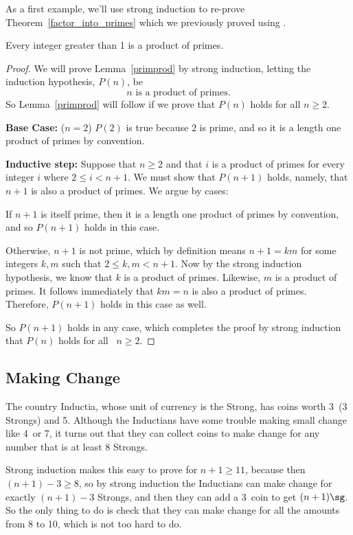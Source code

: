 As a first example, we'll use strong induction to re-prove
Theorem~\ref{factor_into_primes} which we previously proved using .

\begin{lemma}\label{primprod}
Every integer greater than 1 is a product of primes.
\end{lemma}

\begin{proof}

We will prove Lemma~\ref{primprod} by strong induction, letting the induction
hypothesis, $P(n)$, be
\[
n \text{ is a product of primes}.
\]
So Lemma~\ref{primprod} will follow if we prove that $P(n)$ holds for all $n
\geq 2$.

\textbf{Base Case:} ($n=2$) $P(2)$ is true because $2$ is prime, and so it is
a length one product of primes by convention.

\textbf{Inductive step:} Suppose that $n \geq 2$ and that $i$ is a product
of primes for every integer $i$ where $2 \leq i < n+1$.  We must show that
$P(n+1)$ holds, namely, that $n+1$ is also a product of primes.  We argue
by cases:

If $n+1$ is itself prime, then it is a length one product of primes by
convention, and so $P(n+1)$ holds in this case.

Otherwise, $n + 1$ is not prime, which by definition means $n+1 = km$ for
some integers $k,m$ such that $2 \leq k,m < n+1$.  Now by the strong induction
hypothesis, we know that $k$ is a product of primes.  Likewise,
$m$ is a product of primes.  It follows immediately that $km = n$ is
also a product of primes.  Therefore, $P(n+1)$ holds in this case as well.

So $P(n+1)$ holds in any case, which completes the proof by strong
induction that $P(n)$ holds for all ~$n \ge 2$.

\end{proof}

\subsection{Making Change}

The country Inductia, whose unit of currency is the Strong, has coins
worth 3\sg\ (3 Strongs) and 5\sg.  Although the Inductians have some
trouble making small change like 4\sg\ or 7\sg, it turns out that they
can collect coins to make change for any number that is at least 8
Strongs.

Strong induction makes this easy to prove for $n+1 \ge 11$, because then
$(n+1)-3 \ge 8$, so by strong induction the Inductians can make change for
exactly $(n+1)-3$ Strongs, and then they can add a 3\sg\ coin to get
$(n+1)\sg$.  So the only thing to do is check that they can make change
for all the amounts from 8 to 10\sg, which is not too hard to do.

